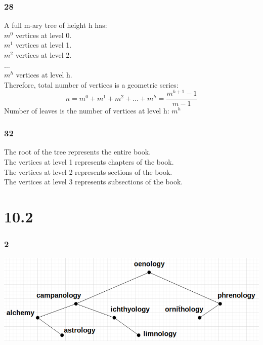 \documentclass[12pt]{article}
\begin{document}
    \section*{28}
      \begin{center}
        A full m-ary tree of height h has:\\
        \(m^0\) vertices at level 0. \\
        \(m^1\) vertices at level 1. \\
        \(m^2\) vertices at level 2. \\
        \(\dots\)\\
        \(m^h\) vertices at level h. \\
        Therefore, total number of vertices is a geometric series:
        \[n = m^0 + m^1 + m^2 + \dots + m^h = \frac{m^{h+1}-1}{m-1}\]
        Number of leaves is the number of vertices at level h: \(m^h\)
      \end{center}

    \section*{32}
      The root of the tree represents the entire book.\\
      The vertices at level 1 represents chapters of the book.\\
      The vertices at level 2 represents sections of the book.\\
      The vertices at level 3 represents subsections of the book.
  \part*{10.2}
    \section*{2}
      \begin{center}
        \includegraphics{binary-search.png}
      \end{center}
\end{document}

